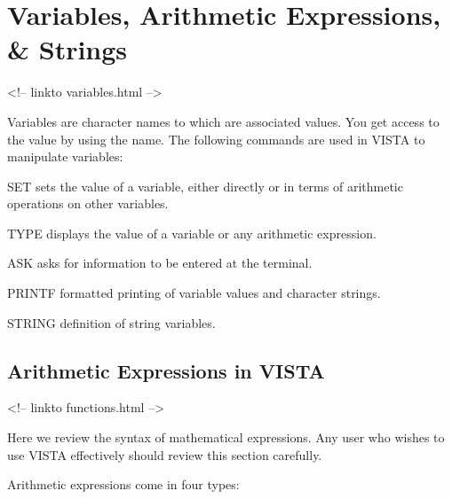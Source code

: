 \chapter{Variables, Arithmetic Expressions, \& Strings}
\begin{rawhtml}
<!-- linkto variables.html -->
\end{rawhtml}

%
%


Variables are character names to which are associated values. 
You get access to the value by using the name.  The following commands
are used in VISTA to manipulate variables: 

\begin{example}
  \item[SET\hfill]{sets the value of a variable, either directly or in
       terms of arithmetic operations on other variables.}

  \item[TYPE\hfill]{displays the value of a variable or any arithmetic
       expression.}

  \item[ASK\hfill]{asks for information to be entered at the terminal.}

  \item[PRINTF\hfill]{formatted printing of variable values and character
       strings.}

  \item[STRING\hfill]{definition of string variables.}
\end{example}

\section{Arithmetic Expressions in VISTA}
\begin{rawhtml}
<!-- linkto functions.html -->
\end{rawhtml}


Here we review the syntax of mathematical expressions.  Any user who wishes
to use VISTA effectively should review this section carefully.

Arithmetic expressions come in four types:


